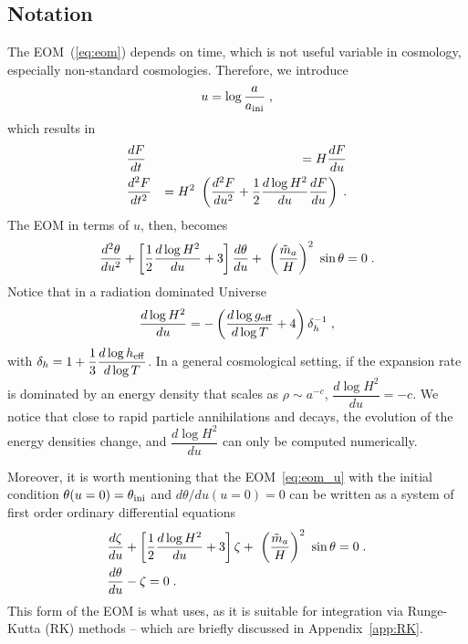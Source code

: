 \documentclass[11pt,a4paper]{article}
\begin{document}
\subsection{Notation}\label{sec:notation}
%
%
The EOM~(\ref{eq:eom}) depends on time, which is not useful variable in cosmology, especially non-standard cosmologies. Therefore, we introduce 
%
\begin{eqnarray}
	u = \log \dfrac{a}{a_{\rm ini}{}} \;,
	\label{eq:natation}
\end{eqnarray}
%
which results in 
%
\begin{eqnarray}
	&\dfrac{d F}{dt} &=  H  \dfrac{d F}{du} 
	\nonumber \\
	&\dfrac{d^2 F}{dt^2} &= H^2 \ \left(  \dfrac{d^2 F}{du^2} + \dfrac{1}{2} \dfrac{d \log H^2}{du}  \dfrac{d F}{du}  \right)\;.
	\label{eq:deriv_u}
\end{eqnarray}
%
The EOM in terms of $u$, then, becomes
%
\begin{equation}
	\dfrac{d^2  \theta}{du^2} + \left[ \dfrac{1}{2} \dfrac{d \log H^2}{du} + 3  \right] \dfrac{d  \theta}{d u} + \ \left( \dfrac{\tilde m_{a}{}}{H} \right)^2 \ \sin \theta
	=0 \;.
	\label{eq:eom_u}
\end{equation}
%
Notice that in a radiation dominated Universe
%
$$
\dfrac{d \log H^2}{du} = -\left(  \dfrac{d \log g_{\rm eff}{}}{d \log T} +4  \right) \delta_h^{-1}\;,
$$
with  $ \delta_h = 1+ \dfrac{1}{3} \dfrac{d \log h_{\rm eff}{}}{d \log T} $. 
%
In a general cosmological setting, if the expansion rate is dominated by an energy density that scales as $\rho \sim a^{-c}$, $\dfrac{d \log H^2}{du}  = -c$. 
%
We notice that close to rapid particle annihilations and decays, the evolution of the energy densities change, and $\dfrac{d \log H^2}{du}$ can only be computed numerically.

Moreover, it is worth mentioning that the EOM~\ref{eq:eom_u} with the initial condition $\theta(u=0)=\theta_{\rm ini}{}$ and $d\theta/du (u=0)=0$ can be written as a system of first 
order ordinary differential equations
%
\begin{eqnarray}
& \dfrac{d  \zeta}{du} + \left[ \dfrac{1}{2} \dfrac{d \log H^2}{du} + 3  \right] \zeta + \ \left( \dfrac{\tilde m_{a}{}}{H} \right)^2 \ \sin \theta
=0 \;. \\ \nonumber
&\dfrac{d \theta}{d u} - \zeta=0 \;.
\label{eq:eom_sys}
\end{eqnarray}
%
This form of the EOM is what \mimes uses, as it is suitable for integration via Runge-Kutta (RK) methods -- which are briefly discussed in Appendix~\ref{app:RK}.
\end{document}
